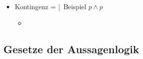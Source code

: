 \begin{frame}
\begin{itemize}[<+->]
    \item \alert{Kontingenz} =  | Beispiel \alert{$p\wedge p$}
      \begin{itemize}[<+->]
        \item[ ] 
      \end{itemize}
  \end{itemize}
\end{frame}

\subsection{Gesetze der Aussagenlogik}

